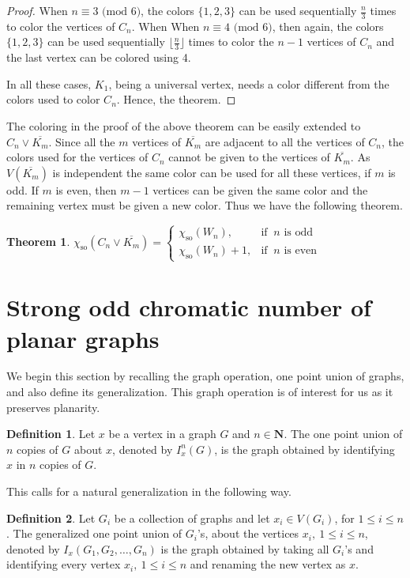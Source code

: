 \documentclass[12pt,a4paper]{article}
\newtheorem{theorem}{Theorem}
\theoremstyle{definition}
\newtheorem*{defn*}{Definition}
\numberwithin{equation}{section}
\begin{document}
\begin{proof}
When $n \equiv 3 \text{ (mod 6)}$, the colors $\{1,2,3\}$ can be used sequentially $\frac{n}{3}$ times to color the vertices of $C_n$. When When $n \equiv 4 \text{ (mod 6)}$, then again, the colors $\{1,2,3\}$ can be used sequentially $\lfloor\frac{n}{3}\rfloor$ times to color the $n-1$ vertices of $C_n$ and the last vertex can be colored using 4.\par

In all these cases, $K_1$, being a universal vertex, needs a color different from the colors used to color $C_n$. Hence, the theorem.
\end{proof}

The coloring in the proof of the above theorem can be easily extended to $C_n \vee \overline{K_m}$. Since all the $m$ vertices of $\overline{K_m}$ are adjacent to all the vertices of $C_n$, the colors used for the vertices of $C_n$ cannot be given to the vertices of $\overline{K_m}$. As $V(\overline{K_m})$ is independent the same color can be used for all these vertices, if $m$ is odd. If $m$ is even, then $m-1$ vertices can be given the same color and the remaining vertex must be given a new color. Thus we have the following theorem. 

\begin{theorem} \label{2 centrals}
     $\chi_{\text{so}}(C_n \vee \overline{K_m}) = \begin{cases}
  \chi_{\text{so}}(W_n), & \text{if }~ n \text{ is odd}\\
   \chi_{\text{so}}(W_n) + 1, & \text{if }~ n \text{ is even}
\end{cases}$
\end{theorem}

\section{Strong odd chromatic number of planar graphs}
We begin this section by recalling the graph operation, one point union of graphs, and also define its generalization. This graph operation is of interest for us as it preserves planarity.

\begin{defn*} \cite{She}
   Let $x$ be a vertex in a graph $G$ and $n \in \textbf{N}$. The one point union of $n$ copies of $G$ about $x$, denoted by $I_x^n(G)$, is the graph obtained by identifying $x$ in $n$ copies of $G$. 
\end{defn*}
This calls for a natural generalization in the following way. 

 \begin{defn*}
     Let $G_i$ be a collection of graphs and let $x_i \in V(G_i)$, for $1\leq i \leq n$. The generalized one point union of $G_i$'s, about the vertices $x_i, ~1\leq i \leq n$, denoted by $I_{x}(G_1,G_2,\ldots,G_n)$ is the graph obtained by taking all $G_i$'s and identifying every vertex $x_i, ~1\leq i \leq n$ and renaming the new vertex as $x$. 
 \end{defn*}
\end{document}
